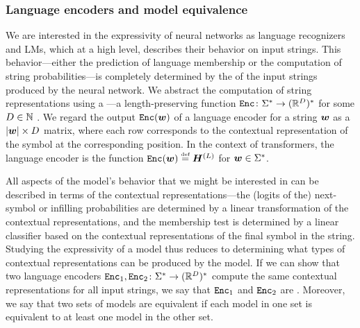 \subsubsection{Language encoders and model equivalence} \label{app:model-equivalence}
We are interested in the expressivity of neural networks as language recognizers and LMs, which at a high level, describes their behavior on input strings.
This behavior---either the prediction of language membership or the computation of string probabilities---is completely determined by the  of the input strings produced by the neural network.
We abstract the computation of string representations using a ---a length-preserving function ${{\textnormal{\texttt{Enc}}}}\colon {{{{{{\Sigma}}^{*}}}}} \to {{({{\mathbb{R}}}^{{{D}}})^{*}}}$ for some ${{D}} \in {{\mathbb{N}}}$ \citep{10.5555/3737916.3740249,cotterell2024formalaspectslanguagemodeling}.
We regard the output ${{\textnormal{\texttt{Enc}}}}({{\boldsymbol{w}}})$ of a language encoder for a string ${{\boldsymbol{w}}}$ as a $|{{\boldsymbol{w}}}| \times {{D}}$ matrix, where each row corresponds to the contextual representation of the symbol at the corresponding position.
In the context of transformers, the language encoder is the function $\langEncFun{\str} \defeq \hiddMtx^{(\numlayers)}$ for ${{\boldsymbol{w}}} \in {{{{{{\Sigma}}^{*}}}}}$.

All aspects of the model's behavior that we might be interested in can be described in terms of the contextual representations---the (logits of the) next-symbol or infilling probabilities are determined by a linear transformation of the contextual representations, and the membership test is determined by a linear classifier based on the contextual representations of the final symbol in the string.
Studying the expressivity of a model thus reduces to determining what types of contextual representations can be produced by the model.
If we can show that two language encoders ${{\textnormal{\texttt{Enc}}}}_1, {{\textnormal{\texttt{Enc}}}}_2 \colon {{{{{{\Sigma}}^{*}}}}} \to {{({{\mathbb{R}}}^{{D}})^{*}}}$ compute the same contextual representations for all input strings, we say that ${{\textnormal{\texttt{Enc}}}}_1$ and ${{\textnormal{\texttt{Enc}}}}_2$ are .
Moreover, we say that two sets of models are equivalent if each model in one set is equivalent to at least one model in the other set.

